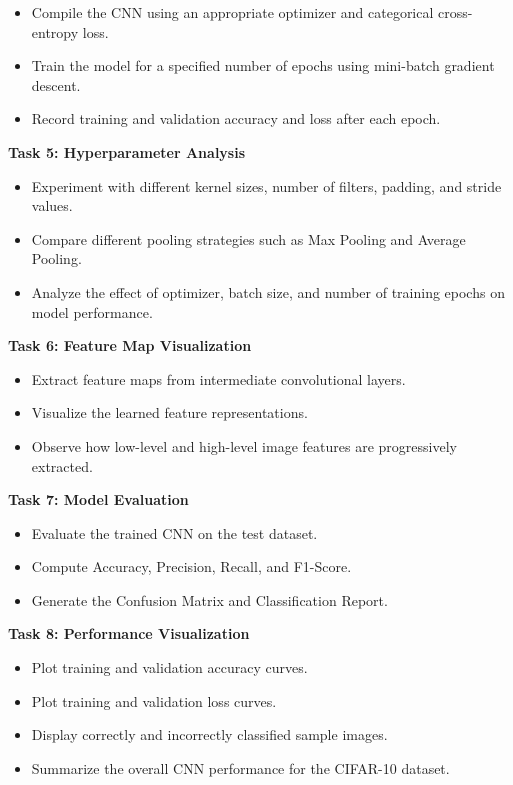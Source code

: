 \documentclass[11pt]{article}
\begin{document}
\begin{itemize}
    \item Compile the CNN using an appropriate optimizer and categorical cross-entropy loss.
    \item Train the model for a specified number of epochs using mini-batch gradient descent.
    \item Record training and validation accuracy and loss after each epoch.
\end{itemize}

\bigskip

\textbf{Task 5: Hyperparameter Analysis}

\begin{itemize}
    \item Experiment with different kernel sizes, number of filters, padding, and stride values.
    \item Compare different pooling strategies such as Max Pooling and Average Pooling.
    \item Analyze the effect of optimizer, batch size, and number of training epochs on model performance.
\end{itemize}


\bigskip

\textbf{Task 6: Feature Map Visualization}

\begin{itemize}
    \item Extract feature maps from intermediate convolutional layers.
    \item Visualize the learned feature representations.
    \item Observe how low-level and high-level image features are progressively extracted.
\end{itemize}


\bigskip

\textbf{Task 7: Model Evaluation}

\begin{itemize}
    \item Evaluate the trained CNN on the test dataset.
    \item Compute Accuracy, Precision, Recall, and F1-Score.
    \item Generate the Confusion Matrix and Classification Report.
\end{itemize}


\bigskip

\textbf{Task 8: Performance Visualization}

\begin{itemize}
    \item Plot training and validation accuracy curves.
    \item Plot training and validation loss curves.
    \item Display correctly and incorrectly classified sample images.
    \item Summarize the overall CNN performance for the CIFAR-10 dataset.
\end{itemize}
\end{document}
